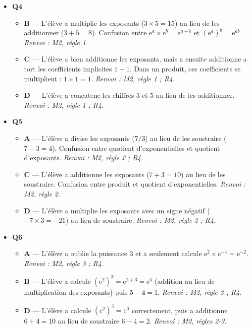 \begin{itemize}
  \item \textbf{Q4}
  \begin{itemize}
    \item \textbf{B} — L'élève a multiplie les exposants ($3 \times 5 = 15$) au lieu de les additionner ($3 + 5 = 8$). Confusion entre $\mathrm{e}^a \times \mathrm{e}^b = \mathrm{e}^{a+b}$ et $(\mathrm{e}^a)^b = \mathrm{e}^{ab}$. \emph{Renvoi : M2, règle 1.}
    \item \textbf{C} — L'élève a bien additionne les exposants, mais a ensuite additionne a tort les coefficients implicites $1+1$. Dans un produit, ces coefficients se multiplient : $1\times1=1$. \emph{Renvoi : M2, règle 1 ; R4.}
    \item \textbf{D} — L'élève a concatene les chiffres $3$ et $5$ au lieu de les additionner. \emph{Renvoi : M2, règle 1 ; R4.}
  \end{itemize}
  \item \textbf{Q5}
  \begin{itemize}
    \item \textbf{A} — L'élève a divise les exposants ($7/3$) au lieu de les soustraire ($7 - 3 = 4$). Confusion entre quotient d'exponentielles et quotient d'exposants. \emph{Renvoi : M2, règle 2 ; R4.}
    \item \textbf{C} — L'élève a additionne les exposants ($7 + 3 = 10$) au lieu de les soustraire. Confusion entre produit et quotient d'exponentielles. \emph{Renvoi : M2, règle 2.}
    \item \textbf{D} — L'élève a multiplie les exposants avec un signe négatif ($-7 \times 3 = -21$) au lieu de soustraire. \emph{Renvoi : M2, règle 2 ; R4.}
  \end{itemize}
  \item \textbf{Q6}
  \begin{itemize}
    \item \textbf{A} — L'élève a oublie la puissance $3$ et a seulement calcule $\mathrm{e}^{2}\times\mathrm{e}^{-4}=\mathrm{e}^{-2}$. \emph{Renvoi : M2, règle 3 ; R4.}
    \item \textbf{B} — L'élève a calcule $(\mathrm{e}^2)^3 = \mathrm{e}^{2+3} = \mathrm{e}^{5}$ (addition au lieu de multiplication des exposants) puis $5 - 4 = 1$. \emph{Renvoi : M2, règle 3 ; R4.}
    \item \textbf{D} — L'élève a calcule $(\mathrm{e}^2)^3 = \mathrm{e}^6$ correctement, puis a additionne $6 + 4 = 10$ au lieu de soustraire $6 - 4 = 2$. \emph{Renvoi : M2, règles 2-3.}
  \end{itemize}

\end{itemize}
